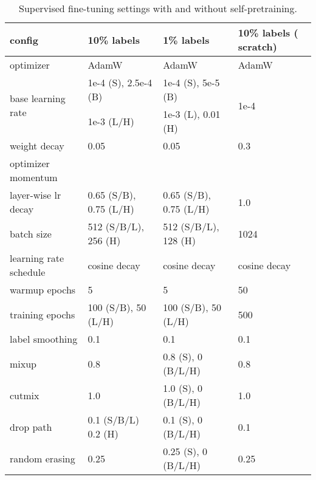 \documentclass{article}
\begin{document}
\setlength{\tabcolsep}{10pt}
\begin{table}[t]
\begin{center}\small
\begin{tabular}{l|lll}
config & 10\% labels  & 1\% labels & 10\% labels ( scratch) \\
\toprule
optimizer & AdamW & AdamW & AdamW  \\
\multirow{2}{*}{base learning rate} & 1e-4 (S), 2.5e-4 (B) & 1e-4 (S), 5e-5 (B) & \multirow{2}{*}{1e-4} \\
& 1e-3 (L/H) & 1e-3 (L), 0.01 (H) & \\
weight decay & 0.05 & 0.05 & 0.3 \\
optimizer momentum &  &  &  \\
layer-wise lr decay \cite{bao2021beit} & 0.65 (S/B), 0.75 (L/H) & 0.65 (S/B), 0.75 (L/H) & 1.0 \\
batch size & 512 (S/B/L), 256 (H) & 512 (S/B/L), 128 (H) & 1024 \\
learning rate schedule & cosine decay & cosine decay & cosine decay \\
warmup epochs & 5  & 5 & 50 \\
training epochs & 100 (S/B), 50 (L/H) & 100 (S/B), 50 (L/H) & 500 \\
label smoothing \cite{DBLP:conf/cvpr/SzegedyVISW16} & 0.1 & 0.1 & 0.1 \\
mixup \cite{DBLP:conf/iclr/ZhangCDL18} & 0.8 &  0.8 (S), 0 (B/L/H) & 0.8 \\
cutmix \cite{DBLP:conf/iccv/YunHCOYC19} & 1.0 & 1.0 (S), 0 (B/L/H) & 1.0 \\
drop path \cite{DBLP:conf/eccv/HuangSLSW16} & 0.1 (S/B/L) 0.2 (H) & 0.1 (S), 0 (B/L/H) & 0.1 \\
random erasing \cite{DBLP:conf/aaai/Zhong0KL020} & 0.25 & 0.25 (S), 0 (B/L/H) & 0.25 \\
\end{tabular}
\caption{Supervised fine-tuning settings with and without self-pretraining.}
\label{tab:impl_finetune}\vspace{-3mm}
\end{center}
\end{table}
\end{document}
